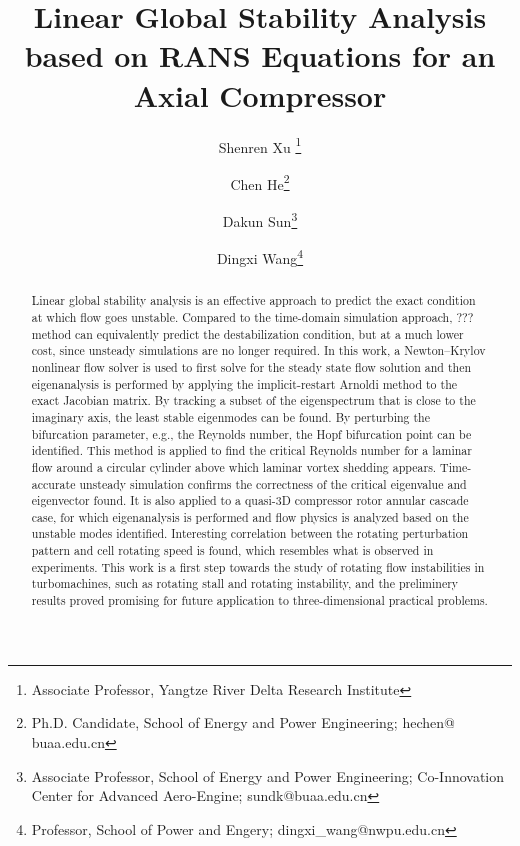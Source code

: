 \documentclass[journal,final]{new-aiaa}
\title{Linear Global Stability Analysis based on RANS Equations for an Axial Compressor}
\author[1]{Shenren Xu	
\footnote{Associate Professor, Yangtze River Delta Research Institute
}
}
\affil[1]{Northwestern Polytechnical University, Taicang~215400, P.R.~China}
\affil[2]{Beihang University, Beijing 100191, P.R.~China}
\author[2]{Chen He\footnote{Ph.D. Candidate, School of Energy and Power Engineering; hechen@
		buaa.edu.cn
	 }}
\author[2]{Dakun Sun\footnote{Associate Professor, School of Energy and Power Engineering; Co-Innovation
		Center for Advanced Aero-Engine; sundk@buaa.edu.cn}}
\author[1]{Dingxi Wang\footnote{Professor, School of Power and Engery; dingxi\_wang@nwpu.edu.cn}
}
\begin{document}
\maketitle

\begin{abstract}
Linear global stability analysis is an effective approach to predict the
exact condition at which flow goes unstable. Compared to the time-domain
simulation approach, ??? method can equivalently predict the destabilization
condition, but at a much lower cost, since unsteady simulations are no longer required.
In this work, a Newton--Krylov nonlinear flow solver is used to first solve for the
steady state flow solution and then eigenanalysis is performed by applying the 
implicit-restart Arnoldi method to the exact Jacobian matrix.
By tracking a subset of the eigenspectrum that is close to the imaginary axis,
the least stable eigenmodes can be found. By perturbing the bifurcation parameter,
e.g., the Reynolds number, the Hopf bifurcation point can be identified.
This method is applied to find the critical Reynolds number for a laminar
flow around a circular cylinder above which laminar vortex shedding appears.
Time-accurate unsteady simulation confirms the correctness of the critical eigenvalue
and eigenvector found. It is also applied to a quasi-3D compressor rotor
annular cascade case, for which eigenanalysis is performed and flow physics
is analyzed based on the unstable modes identified. Interesting correlation
between the rotating perturbation pattern and cell rotating speed is found,
which resembles what is observed in experiments.
This work is a first step towards the study of
rotating flow instabilities in turbomachines, such as rotating stall and rotating instability,
and the preliminery results proved promising for future
application to three-dimensional practical problems.
	
	
	

\end{abstract}
\end{document}
